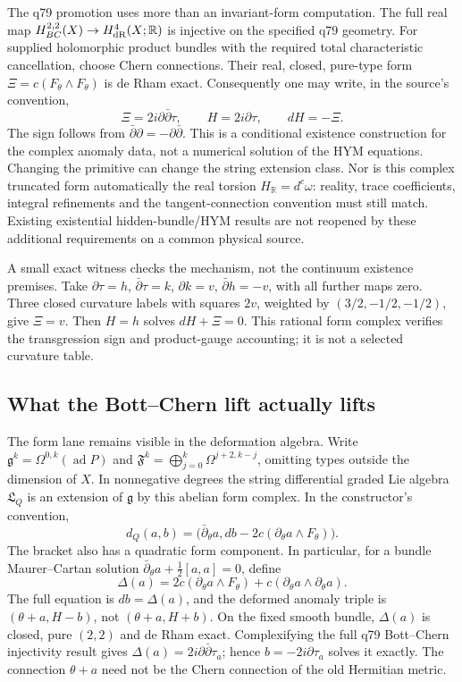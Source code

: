 \documentclass[11pt,a4paper]{article}
\newcommand{\ad}{\operatorname{ad}}
\begin{document}
The q79 promotion uses more than an invariant-form computation. The full
real map \(H^{2,2}_{BC}(X)\to H^4_{\rm dR}(X;\mathbb R)\) is injective on
the specified q79 geometry. For supplied holomorphic product bundles with
the required total characteristic cancellation, choose Chern connections.
Their real, closed, pure-type form
\(\Xi=c(F_\theta\wedge F_\theta)\) is de Rham exact. Consequently one may
write, in the source's convention,
\[
 \Xi=2i\partial\bar\partial\tau,\qquad
 H=2i\partial\tau,\qquad dH=-\Xi .
 \tag{S2}\label{eq:string-bc-primitive}
\]
The sign follows from \(\bar\partial\partial=-\partial\bar\partial\).
This is a conditional existence construction for the complex anomaly data,
not a numerical solution of the HYM equations. Changing the primitive can
change the string extension class. Nor is this complex truncated form
automatically the real torsion \(H_{\mathbb R}=d^c\omega\): reality, trace
coefficients, integral refinements and the tangent-connection convention
must still match. Existing existential hidden-bundle/HYM results are not
reopened by these additional requirements on a common physical source.

A small exact witness checks the mechanism, not the continuum existence
premises. Take \(\partial\tau=h\), \(\bar\partial\tau=k\),
\(\partial k=v\), \(\bar\partial h=-v\), with all further maps zero.
Three closed curvature labels with squares \(2v\), weighted by
\((3/2,-1/2,-1/2)\), give \(\Xi=v\). Then \(H=h\) solves
\(dH+\Xi=0\). This rational form complex verifies the transgression sign
and product-gauge accounting; it is not a selected curvature table.

\subsection{What the Bott--Chern lift actually lifts}
\label{sec:string-mc-lift}

The form lane remains visible in the deformation algebra. Write
\(\mathfrak g^k=\Omega^{0,k}(\ad P)\) and
\(\mathfrak F^k=\bigoplus_{j=0}^k\Omega^{j+2,k-j}\), omitting types outside
the dimension of \(X\). In nonnegative degrees the string differential
graded Lie algebra \(\mathfrak L_Q\) is an extension of \(\mathfrak g\)
by this abelian form complex. In the constructor's convention,
\[
 d_Q(a,b)=\bigl(\bar\partial_\theta a,
             db-2c(\partial_\theta a\wedge F_\theta)\bigr).
\]
The bracket also has a quadratic form component. In particular, for a
bundle Maurer--Cartan solution
\(\bar\partial_\theta a+\tfrac12[a,a]=0\), define
\[
 \Delta(a)=2c(\partial_\theta a\wedge F_\theta)
                 +c(\partial_\theta a\wedge\partial_\theta a).
 \tag{S3}\label{eq:string-deformation}
\]
The full equation is \(db=\Delta(a)\), and the deformed anomaly triple is
\((\theta+a,H-b)\), not \((\theta+a,H+b)\). On the fixed smooth bundle,
\(\Delta(a)\) is closed, pure \((2,2)\) and de Rham exact. Complexifying
the full q79 Bott--Chern injectivity result gives
\(\Delta(a)=2i\partial\bar\partial\tau_a\); hence
\(b=-2i\partial\tau_a\) solves it exactly. The connection \(\theta+a\)
need not be the Chern connection of the old Hermitian metric.
\end{document}
